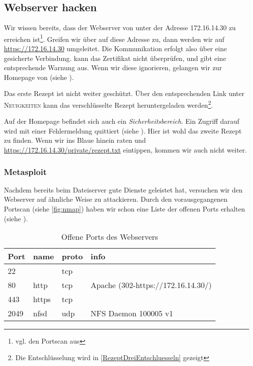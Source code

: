 \subsection{Webserver hacken}

Wir wissen bereits, dass der Webserver von \Mayerbrot{} unter der Adresse
172.16.14.30 zu erreichen ist\footnote{vgl. den Portscan aus
  }. Greifen wir über \Firefox{} auf diese Adresse zu,
dann werden wir auf \url{https://172.16.14.30} umgeleitet. Die Kommunikation
erfolgt also über eine gesicherte Verbindung. \Firefox{} kann das Zertifikat
nicht überprüfen, und gibt eine entsprechende Warnung aus. Wenn wir diese
ignorieren, gelangen wir zur Homepage von \Mayerbrot{} (siehe
).


Das erste Rezept ist nicht weiter geschützt. Über den entsprechenden Link unter
\textsc{Neuigkeiten} kann das verschlüsselte Rezept heruntergeladen
werden\footnote{Die Entschlüsselung wird in \cref{RezeptDreiEntschluesseln}
  gezeigt}.

Auf der Homepage befindet sich auch ein \emph{Sicherheitsbereich}. Ein Zugriff
darauf wird mit einer Fehlermeldung quittiert (siehe
). Hier ist wohl das zweite Rezept zu finden. Wenn wir
ins Blaue hinein raten und \url{https://172.16.14.30/private/rezept.txt}
eintippen, kommen wir auch nicht weiter.


\subsubsection{Metasploit}

Nachdem \Metasploit{} bereits beim Dateiserver gute Dienste geleistet hat,
versuchen wir den Webserver auf ähnliche Weise zu attackieren. Durch den
vorausgegangenen Portscan (siehe \cref{fig:nmap}) haben wir schon eine Liste der
offenen Ports erhalten (siehe ).

\begin{table}[H]
\caption{Offene Ports des Webservers}
\label{WebserverPortScan}
\centering
\begin{tabular}{llll}
\toprule
Port & name & proto & info\\
\midrule
22 & & tcp & \\
80 & http & tcp & Apache (302-https://172.16.14.30/) \\
443 & https & tcp & \\
2049 & nfsd & udp & NFS Daemon 100005 v1\\
\bottomrule
\end{tabular}
\end{table}

